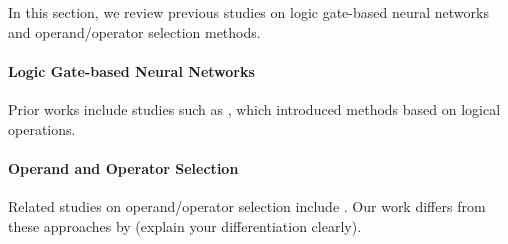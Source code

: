 In this section, we review previous studies on logic gate-based neural networks and operand/operator selection methods.

\paragraph{Logic Gate-based Neural Networks}
Prior works include studies such as \citep{example2023}, which introduced methods based on logical operations.

\paragraph{Operand and Operator Selection}
Related studies on operand/operator selection include \citep{example2024}. Our work differs from these approaches by (explain your differentiation clearly).
